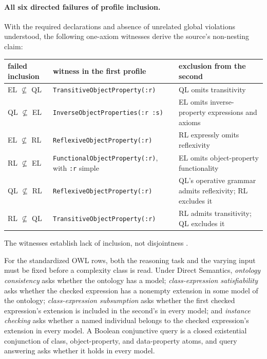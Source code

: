 \paragraph{All six directed failures of profile inclusion.}
With the required declarations and absence of unrelated global violations
understood, the following one-axiom witnesses derive the source's non-nesting
claim:
\begin{center}
\small
\begin{tabularx}{\textwidth}{@{}l X X@{}}
\toprule
failed inclusion & witness in the first profile & exclusion from the second\\
\midrule
EL \(\nsubseteq\) QL & \texttt{TransitiveObjectProperty(:r)} &
QL omits transitivity\\
QL \(\nsubseteq\) EL & \texttt{InverseObjectProperties(:r :s)} &
EL omits inverse-property expressions and axioms\\
EL \(\nsubseteq\) RL & \texttt{ReflexiveObjectProperty(:r)} &
RL expressly omits reflexivity\\
RL \(\nsubseteq\) EL & \texttt{FunctionalObjectProperty(:r)}, with
\texttt{:r} simple & EL omits object-property functionality\\
QL \(\nsubseteq\) RL & \texttt{ReflexiveObjectProperty(:r)} &
QL's operative grammar admits reflexivity; RL excludes it\\
RL \(\nsubseteq\) QL & \texttt{TransitiveObjectProperty(:r)} &
RL admits transitivity; QL excludes it\\
\bottomrule
\end{tabularx}
\end{center}
The witnesses establish lack of inclusion, not disjointness
\cite[\S\S1--4]{W3COWL2Profiles2012}.

For the standardized OWL rows, both the reasoning task and the varying input
must be fixed before a complexity class is read.  Under Direct Semantics,
\emph{ontology consistency} asks whether the ontology has a model;
\emph{class-expression satisfiability} asks whether the checked expression has
a nonempty extension in some model of the ontology; \emph{class-expression
subsumption} asks whether the first checked expression's extension is included
in the second's in every model; and \emph{instance checking} asks whether a
named individual belongs to the checked expression's extension in every model.
A Boolean conjunctive query is a closed existential conjunction of class,
object-property, and data-property atoms, and query answering asks whether it
holds in every model.

